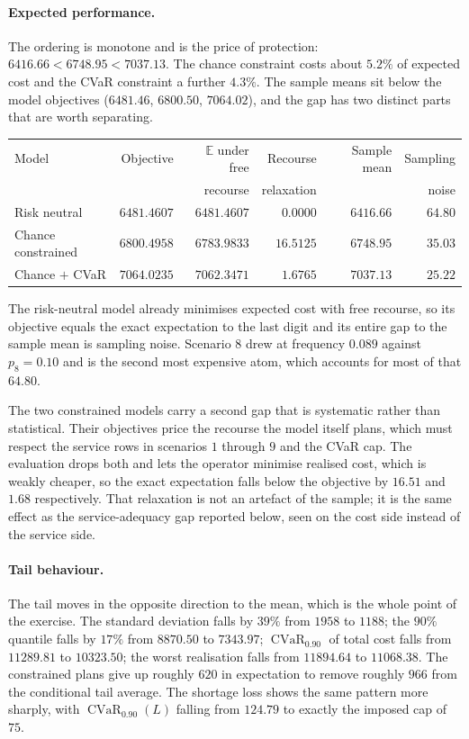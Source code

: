 \documentclass[11pt]{article}
\DeclareMathOperator{\CVaR}{CVaR}
\theoremstyle{definition}\newtheorem*{definition}{Definition}
\theoremstyle{definition}
\begin{document}
\paragraph{Expected performance.} The ordering is monotone and is the
price of protection: $6416.66 < 6748.95 < 7037.13$. The chance constraint
costs about $5.2\%$ of expected cost and the CVaR constraint a further
$4.3\%$. The sample means sit below the model objectives
($6481.46$, $6800.50$, $7064.02$), and the gap has two distinct parts
that are worth separating.

\begin{center}
\begin{tabular}{@{}lrrrrr@{}}
\toprule
Model & Objective & $\mathbb{E}$ under free & Recourse
  & Sample mean & Sampling \\
 & & recourse & relaxation & & noise \\
\midrule
Risk neutral       & $6481.4607$ & $6481.4607$ & $0.0000$
  & $6416.66$ & $64.80$ \\
Chance constrained & $6800.4958$ & $6783.9833$ & $16.5125$
  & $6748.95$ & $35.03$ \\
Chance $+$ CVaR    & $7064.0235$ & $7062.3471$ & $1.6765$
  & $7037.13$ & $25.22$ \\
\bottomrule
\end{tabular}
\end{center}

The risk-neutral model already minimises expected cost with free
recourse, so its objective equals the exact expectation to the last
digit and its entire gap to the sample mean is sampling noise. Scenario
$8$ drew at frequency $0.089$ against $p_8 = 0.10$ and is the second most
expensive atom, which accounts for most of that $64.80$.

The two constrained models carry a second gap that is systematic rather
than statistical. Their objectives price the recourse the model itself
plans, which must respect the service rows in scenarios $1$ through $9$
and the CVaR cap. The evaluation drops both and lets the operator
minimise realised cost, which is weakly cheaper, so the exact
expectation falls below the objective by $16.51$ and $1.68$
respectively. That relaxation is not an artefact of the sample; it is
the same effect as the service-adequacy gap reported below, seen on the
cost side instead of the service side.

\paragraph{Tail behaviour.} The tail moves in the opposite direction to
the mean, which is the whole point of the exercise. The standard
deviation falls by $39\%$ from $1958$ to $1188$; the $90\%$ quantile
falls by $17\%$ from $8870.50$ to $7343.97$; $\CVaR_{0.90}$ of total cost
falls from $11289.81$ to $10323.50$; the worst realisation falls from
$11894.64$ to $11068.38$. The constrained plans give up roughly $620$ in
expectation to remove roughly $966$ from the conditional tail average.
The shortage loss shows the same pattern more sharply, with
$\CVaR_{0.90}(L)$ falling from $124.79$ to exactly the imposed cap of
$75$.
\end{document}

